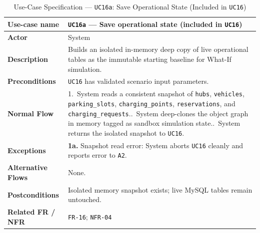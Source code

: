 \begin{table}[H]
  \centering
  \singlespacing\footnotesize
  \caption{Use-Case Specification --- \texttt{UC16a}: Save Operational State (Included in \texttt{UC16})}
  \label{tab:uc16a}
  \renewcommand{\arraystretch}{1.13}
  \begin{tabularx}{\textwidth}{|L{2.9cm}|Y|}
    \hline
    \textbf{Use-case name} & \textbf{\texttt{UC16a} --- Save operational state (included in \texttt{UC16})} \\
    \hline
    \textbf{Actor} & System \\
    \hline
    \textbf{Description} & Builds an isolated in-memory deep copy of live operational tables as the immutable starting baseline for What-If simulation. \\
    \hline
    \textbf{Preconditions} & \texttt{UC16} has validated scenario input parameters. \\
    \hline
    \textbf{Normal Flow} & 1.\ System reads a consistent snapshot of \texttt{hubs}, \texttt{vehicles}, \texttt{parking\_\allowbreak slots}, \texttt{charging\_\allowbreak points}, \texttt{reservations}, and \texttt{charging\_\allowbreak requests}..\ System deep-clones the object graph in memory tagged as sandbox simulation state..\ System returns the isolated snapshot to \texttt{UC16}. \\
    \hline
    \textbf{Exceptions} & \textbf{1a.} Snapshot read error: System aborts \texttt{UC16} cleanly and reports error to \texttt{A2}. \\
    \hline
    \textbf{Alternative Flows} & None. \\
    \hline
    \textbf{Postconditions} & Isolated memory snapshot exists; live MySQL tables remain untouched. \\
    \hline
    \textbf{Related FR / NFR} & \texttt{FR-16}; \texttt{NFR-04} \\
    \hline
  \end{tabularx}
\end{table}

